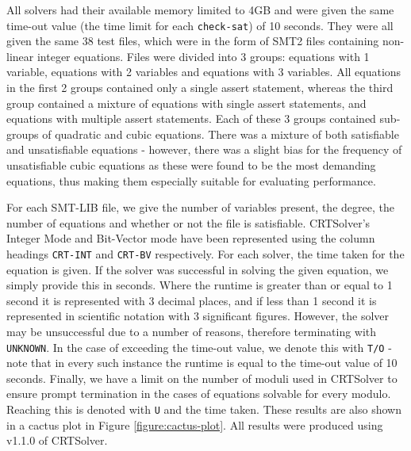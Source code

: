 All solvers had their available memory limited to 4GB and were given the same time-out value 
(the time limit for each \texttt{check-sat}) of 10 seconds.
They were all given the same 38 test 
files, which were in the form of SMT2 files containing non-linear integer equations. Files were divided into 3 
groups: equations with 1 variable, equations with 2 variables and equations with 3 variables.
All equations in the first 2 groups contained only a single assert statement, whereas the third group
contained a mixture of equations with single assert statements, and equations with multiple assert statements.
Each of these 3 groups contained sub-groups of quadratic and cubic equations. There was a mixture of both 
satisfiable and unsatisfiable equations - however, there was a slight bias for the frequency of unsatisfiable 
cubic equations as these were found to be the most demanding equations, thus making them especially suitable 
for evaluating performance.

For each SMT-LIB file, we give the number of variables present, the degree, the number of equations and whether or not the file is 
satisfiable. CRTSolver's Integer Mode and Bit-Vector mode have been represented using the column headings 
\texttt{CRT-INT} and \texttt{CRT-BV} respectively. For each solver, the time taken for the equation is given. 
If the solver was successful in solving the given equation, we simply provide this in seconds. Where
the runtime is greater than or equal to 1 second it is represented with 3 decimal places, and if less 
than 1 second it is represented in scientific notation with 3 significant figures. 
However, the solver may be unsuccessful due to
a number of reasons, therefore terminating with \texttt{UNKNOWN}.
%
In the case of exceeding the time-out value,
we denote this with \texttt{T/O} - note that in every such instance the runtime is equal to the 
time-out value of 10 seconds.
%
Finally, we have a limit on the number of moduli used in CRTSolver to
ensure prompt termination in the cases of equations solvable for every
modulo.
Reaching this is denoted with \texttt{U} and the time taken.
These results are also shown in a cactus plot in Figure \ref{figure:cactus-plot}.
All results were produced using v1.1.0 of CRTSolver.

